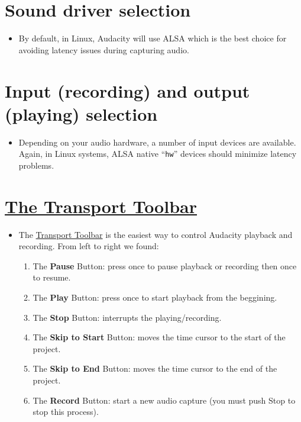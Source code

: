 \section{Sound driver selection}
\begin{itemize}
\item By default, in Linux, Audacity will use ALSA which is the best
  choice for avoiding latency issues during capturing audio.
\end{itemize}

\section{Input (recording) and output (playing) selection}
\begin{itemize}
\item Depending on your audio hardware, a number of input devices are
  available. Again, in Linux systems, ALSA native ``\texttt{hw}'' devices
  should minimize latency problems.
\end{itemize}

\section{\href{http://manual.audacityteam.org/o/man/transport_toolbar.html}{The Transport Toolbar}}
\begin{itemize}
\item The
  \href{http://manual.audacityteam.org/o/man/playing_and_recording.html}{Transport
    Toolbar} is the easiest way to control Audacity playback and
  recording. From left to right we found:
\begin{enumerate}
\item The \textbf{Pause} Button: press once to pause playback or
  recording then once to resume.
\item The \textbf{Play} Button: press once to start playback from the
  beggining.
\item The \textbf{Stop} Button: interrupts the playing/recording.
\item The \textbf{Skip to Start} Button: moves the time cursor to the
  start of the project.
\item The \textbf{Skip to End} Button: moves the time cursor to the
  end of the project.
\item The \textbf{Record} Button: start a new audio capture (you must
  push Stop to stop this process).
\end{enumerate}
\end{itemize}

